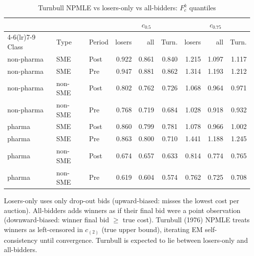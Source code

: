 \begin{table}[htbp]
\centering
\begin{threeparttable}
\caption{Turnbull NPMLE vs losers-only vs all-bidders: $F_c^k$ quantiles}
\label{tab:v3_turnbull_fc}
\small
\begin{tabular}{lllrrrrrr}
\toprule
 & & & \multicolumn{3}{c}{$c_{0.5}$} & \multicolumn{3}{c}{$c_{0.75}$} \\
\cmidrule(lr){4-6}\cmidrule(lr){7-9}
Class & Type & Period & losers & all & Turn. & losers & all & Turn. \\
\midrule
non-pharma & SME & Post & 0.922 & 0.861 & 0.840 & 1.215 & 1.097 & 1.117 \\
non-pharma & SME & Pre & 0.947 & 0.881 & 0.862 & 1.314 & 1.193 & 1.212 \\
non-pharma & non-SME & Post & 0.802 & 0.762 & 0.726 & 1.068 & 0.964 & 0.971 \\
non-pharma & non-SME & Pre & 0.768 & 0.719 & 0.684 & 1.028 & 0.918 & 0.932 \\
pharma & SME & Post & 0.860 & 0.799 & 0.781 & 1.078 & 0.966 & 1.002 \\
pharma & SME & Pre & 0.863 & 0.800 & 0.710 & 1.441 & 1.188 & 1.245 \\
pharma & non-SME & Post & 0.674 & 0.657 & 0.633 & 0.814 & 0.774 & 0.765 \\
pharma & non-SME & Pre & 0.619 & 0.604 & 0.574 & 0.762 & 0.725 & 0.708 \\
\bottomrule
\end{tabular}
\begin{tablenotes}\footnotesize
\item Losers-only uses only drop-out bids (upward-biased: misses
the lowest cost per auction). All-bidders adds winners as if
their final bid were a point observation (downward-biased: winner
final bid $\ge$ true cost). Turnbull (1976) NPMLE treats winners
as left-censored in $c_{(2)}$ (true upper bound), iterating EM
self-consistency until convergence. Turnbull is expected to lie
between losers-only and all-bidders.
\end{tablenotes}
\end{threeparttable}
\end{table}
